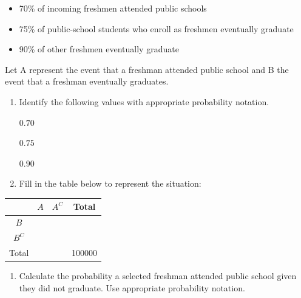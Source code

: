 \documentclass[
]{report}
\providecommand{\tightlist}{%
  \setlength{\itemsep}{0pt}\setlength{\parskip}{0pt}}
\begin{document}
\begin{itemize}
\item
  70\% of incoming freshmen attended public schools
\item
  75\% of public-school students who enroll as freshmen eventually graduate
\item
  90\% of other freshmen eventually graduate
\end{itemize}

Let A represent the event that a freshman attended public school and B the event that a freshman eventually graduates.

\begin{enumerate}
\def\labelenumi{\alph{enumi}.}
\item
  Identify the following values with appropriate probability notation.
  \vspace{2mm}

  \(0.70\)
  \vspace{2mm}

  \(0.75\)
  \vspace{2mm}

  \(0.90\)
  \vspace{2mm}
\item
  Fill in the table below to represent the situation:
\end{enumerate}

\begin{center}
\begin{tabular}{|c|c|c|c|} \hline
\hspace{0.8in} & \hspace{0.25in}  $A$ \hspace{.25in} & \hspace{0.25in} $A^C$ \hspace{0.25in} & \hspace{0.25in} Total \hspace{0.25in} \\ \hline
 $B$ &  &  &  \\ \hline
 $B^C$ &  & &  \\ \hline
Total &  &  & 100000 \\ \hline
\end{tabular}
\end{center}
\vspace{.1in}

\begin{enumerate}
\def\labelenumi{\alph{enumi}.}
\setcounter{enumi}{2}
\tightlist
\item
  Calculate the probability a selected freshman attended public school given they did not graduate. Use appropriate probability notation.
\end{enumerate}
\end{document}
